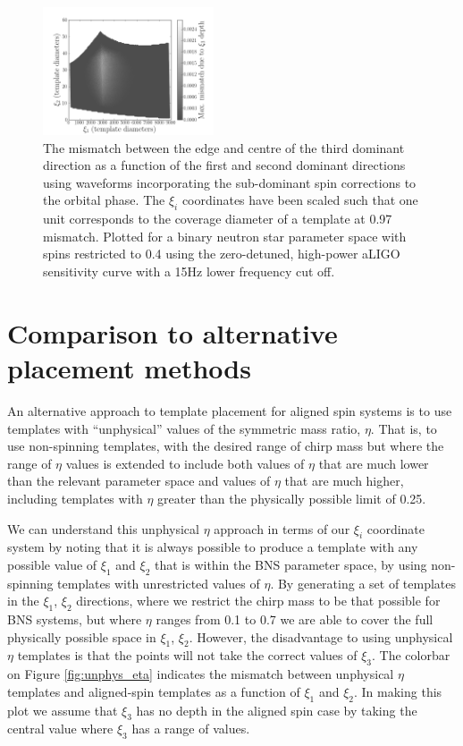 \begin{figure}
\includegraphics[width=0.45\textwidth]{papers/bns_spin/figure8.png}
\caption{\label{fig:higher_order_spin} The mismatch between the edge and centre of the
third dominant direction as a function of the first and second dominant
directions using waveforms incorporating the sub-dominant spin corrections to the orbital phase.
The $\xi_i$ coordinates have been scaled
such that one unit corresponds to the coverage diameter of a template
at 0.97 mismatch.
Plotted for a binary neutron star parameter space with spins restricted
to 0.4
using the zero-detuned, high-power aLIGO sensitivity curve with a 15Hz lower frequency cut off.}
\end{figure}

\section{Comparison to alternative placement methods}

An alternative approach to template placement for aligned spin systems is to use templates
with ``unphysical'' values of the symmetric mass ratio, $\eta$.
That is, to use non-spinning templates, with the desired range of chirp
mass but where the range of $\eta$ values is extended to include both values of $\eta$ that are much lower than
the relevant parameter space and values of $\eta$ that are much higher,
including templates with $\eta$ greater than the physically possible limit of 0.25.

We can understand this unphysical $\eta$ approach in terms of our $\xi_i$ coordinate system by noting that
it is always possible to produce a template with any possible value
of $\xi_1$ and $\xi_2$ that is within the BNS parameter space, by using non-spinning templates
with unrestricted values of $\eta$.
By generating a set of templates in the $\xi_1$, $\xi_2$ directions,
where we restrict the chirp mass to be that possible for BNS systems, but where $\eta$
ranges from 0.1 to 0.7 we are able to cover the full physically possible space in $\xi_1$, $\xi_2$. However,
the disadvantage to using unphysical $\eta$ templates is that the points will not take the correct values
of $\xi_3$. The colorbar on Figure \ref{fig:unphys_eta} indicates the mismatch between unphysical $\eta$ templates and
aligned-spin templates as a function of $\xi_1$ and $\xi_2$. In making this plot we assume that $\xi_3$
has no depth in the aligned spin case by taking the central value where $\xi_3$ has a range of values.

